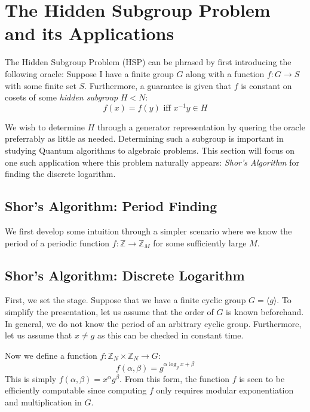 \section{The Hidden Subgroup Problem and its Applications}

The Hidden Subgroup Problem (HSP) can be phrased by first introducing the following oracle:
%
Suppose I have a finite group $G$ along with a function $f: G \rightarrow S$ with some finite set $S$. Furthermore, a guarantee is given that $f$ is constant on cosets of some
\textit{hidden subgroup} $H < N$:
%
$$ f(x) = f(y) \text{ iff } x^{-1}y \in H $$

We wish to determine $H$ through a generator representation by quering the oracle preferrably as little as needed. Determining such a subgroup is important in studying Quantum algorithms to algebraic problems. This section will focus on one such application where this problem naturally appears: \emph{Shor's Algorithm} for finding the discrete logarithm.
%
\subsection{Shor's Algorithm: Period Finding}
We first develop some intuition through a simpler scenario where we know the period of a periodic function $f: \mathbb{Z} \rightarrow \mathbb{Z}_M$ for some sufficiently large $M$.

\subsection{Shor's Algorithm: Discrete Logarithm}
First, we set the stage. Suppose that we have a finite cyclic group $G = \langle g \rangle$. To simplify the presentation, let us assume that the order of $G$ is known beforehand. In general, we do not know the period of an arbitrary cyclic group. Furthermore, let us assume that $x \neq g$ as this can be checked in constant time.
%

Now we define a function $f: \mathbb{Z}_N \times \mathbb{Z}_N \rightarrow G$:
\begin{equation}
  f(\alpha,\beta) = g^{\alpha\log_g{x} + \beta}
\end{equation}
This is simply $f(\alpha,\beta) = x^{\alpha}g^{\beta}$. From this form, the function $f$ is seen to be efficiently computable since computing $f$ only requires modular exponentiation and multiplication in $G$.

